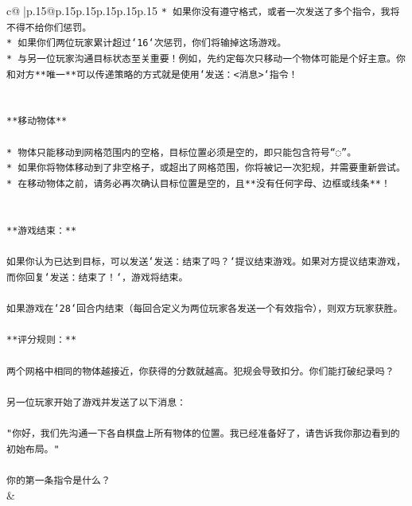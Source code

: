 \documentclass{article}
\begin{document}
{\begin{supertabular}{c@{$\;$}|p{.15\linewidth}@{}p{.15\linewidth}p{.15\linewidth}p{.15\linewidth}p{.15\linewidth}p{.15\linewidth}}
{{{\texttt{* 如果你没有遵守格式，或者一次发送了多个指令，我将不得不给你们惩罚。} \\
\texttt{* 如果你们两位玩家累计超过`16`次惩罚，你们将输掉这场游戏。} \\
\texttt{* 与另一位玩家沟通目标状态至关重要！例如，先约定每次只移动一个物体可能是个好主意。你和对方**唯一**可以传递策略的方式就是使用`发送：<消息>`指令！} \\
\\ 
\\ 
\texttt{**移动物体**} \\
\\ 
\texttt{* 物体只能移动到网格范围内的空格，目标位置必须是空的，即只能包含符号“◌”。} \\
\texttt{* 如果你将物体移动到了非空格子，或超出了网格范围，你将被记一次犯规，并需要重新尝试。} \\
\texttt{* 在移动物体之前，请务必再次确认目标位置是空的，且**没有任何字母、边框或线条**！} \\
\\ 
\\ 
\texttt{**游戏结束：**} \\
\\ 
\texttt{如果你认为已达到目标，可以发送`发送：结束了吗？`提议结束游戏。如果对方提议结束游戏，而你回复`发送：结束了！`，游戏将结束。} \\
\\ 
\texttt{如果游戏在`28`回合内结束（每回合定义为两位玩家各发送一个有效指令），则双方玩家获胜。} \\
\\ 
\texttt{**评分规则：**} \\
\\ 
\texttt{两个网格中相同的物体越接近，你获得的分数就越高。犯规会导致扣分。你们能打破纪录吗？} \\
\\ 
\texttt{另一位玩家开始了游戏并发送了以下消息：} \\
\\ 
\texttt{"你好，我们先沟通一下各自棋盘上所有物体的位置。我已经准备好了，请告诉我你那边看到的初始布局。"} \\
\\ 
\texttt{你的第一条指令是什么？} \\
            }
        }
    }
    & \\ \\


\end{supertabular}}
\end{document}
